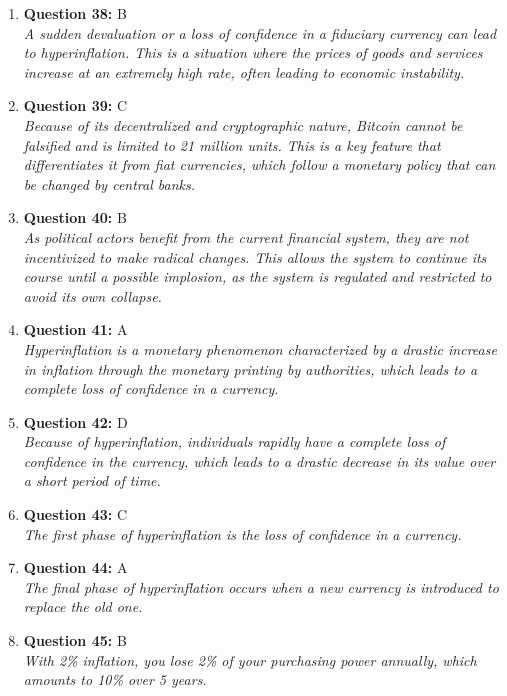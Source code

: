 \documentclass[12pt,a4paper]{article}
\begin{document}
\begin{enumerate}
\item \textbf{Question 38:} B
\\ \textit{A sudden devaluation or a loss of confidence in a fiduciary currency can lead to hyperinflation. This is a situation where the prices of goods and services increase at an extremely high rate, often leading to economic instability.}

\item \textbf{Question 39:} C
\\ \textit{Because of its decentralized and cryptographic nature, Bitcoin cannot be falsified and is limited to 21 million units. This is a key feature that differentiates it from fiat currencies, which follow a monetary policy that can be changed by central banks.}

\item \textbf{Question 40:} B
\\ \textit{As political actors benefit from the current financial system, they are not incentivized to make radical changes. This allows the system to continue its course until a possible implosion, as the system is regulated and restricted to avoid its own collapse.}

\item \textbf{Question 41:} A
\\ \textit{Hyperinflation is a monetary phenomenon characterized by a drastic increase in inflation through the monetary printing by authorities, which leads to a complete loss of confidence in a currency.}

\item \textbf{Question 42:} D
\\ \textit{Because of hyperinflation, individuals rapidly have a complete loss of confidence in the currency, which leads to a drastic decrease in its value over a short period of time.}

\item \textbf{Question 43:} C
\\ \textit{The first phase of hyperinflation is the loss of confidence in a currency.}

\item \textbf{Question 44:} A
\\ \textit{The final phase of hyperinflation occurs when a new currency is introduced to replace the old one.}

\item \textbf{Question 45:} B
\\ \textit{With 2\% inflation, you lose 2\% of your purchasing power annually, which amounts to 10\% over 5 years.}


\end{enumerate}
\end{document}
